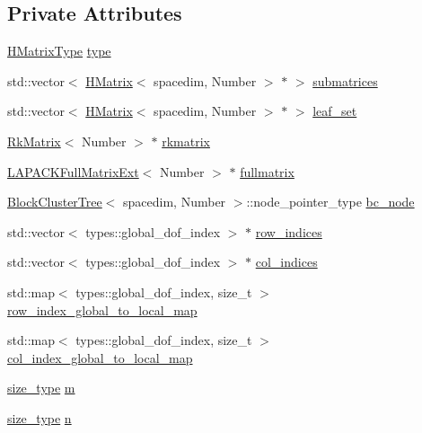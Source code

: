 \subsection*{Private Attributes}
\begin{DoxyCompactItemize}
\item 
\hyperlink{hmatrix_8h_ac04719e202c88f36e4533fe1d326a494}{H\+Matrix\+Type} \hyperlink{classHMatrix_a89ef60f3ba737c04708195ca0bb13620}{type}
\item 
std\+::vector$<$ \hyperlink{classHMatrix}{H\+Matrix}$<$ spacedim, Number $>$ $\ast$ $>$ \hyperlink{classHMatrix_a4bd1b9a32f2c7693e603a7c6ea916e4f}{submatrices}
\item 
std\+::vector$<$ \hyperlink{classHMatrix}{H\+Matrix}$<$ spacedim, Number $>$ $\ast$ $>$ \hyperlink{classHMatrix_a61dbd471077be0ad8325d0f2afe3d43f}{leaf\+\_\+set}
\item 
\hyperlink{classRkMatrix}{Rk\+Matrix}$<$ Number $>$ $\ast$ \hyperlink{classHMatrix_aa97a8f5e42aba0f1d5faf41f35a27819}{rkmatrix}
\item 
\hyperlink{classLAPACKFullMatrixExt}{L\+A\+P\+A\+C\+K\+Full\+Matrix\+Ext}$<$ Number $>$ $\ast$ \hyperlink{classHMatrix_a328134c9e9cb2c4b05d5431c0ca8a533}{fullmatrix}
\item 
\hyperlink{classBlockClusterTree}{Block\+Cluster\+Tree}$<$ spacedim, Number $>$\+::node\+\_\+pointer\+\_\+type \hyperlink{classHMatrix_a4a304494c970b5b267be1d8459d51586}{bc\+\_\+node}
\item 
std\+::vector$<$ types\+::global\+\_\+dof\+\_\+index $>$ $\ast$ \hyperlink{classHMatrix_a33b3a936f1b40e320e96d47471da07ae}{row\+\_\+indices}
\item 
std\+::vector$<$ types\+::global\+\_\+dof\+\_\+index $>$ $\ast$ \hyperlink{classHMatrix_ac30ae65e37ec5e4ccc7de2f6b9ea91e6}{col\+\_\+indices}
\item 
std\+::map$<$ types\+::global\+\_\+dof\+\_\+index, size\+\_\+t $>$ \hyperlink{classHMatrix_a4d64145335fc0521603b206a22a67578}{row\+\_\+index\+\_\+global\+\_\+to\+\_\+local\+\_\+map}
\item 
std\+::map$<$ types\+::global\+\_\+dof\+\_\+index, size\+\_\+t $>$ \hyperlink{classHMatrix_ab337c7b4f2f40699b9b7f3ab17a1e056}{col\+\_\+index\+\_\+global\+\_\+to\+\_\+local\+\_\+map}
\item 
\hyperlink{classHMatrix_a5ca8dc549783d38371a01ecd621ecb34}{size\+\_\+type} \hyperlink{classHMatrix_aa5523463043e4d542eae17d262bd22ad}{m}
\item 
\hyperlink{classHMatrix_a5ca8dc549783d38371a01ecd621ecb34}{size\+\_\+type} \hyperlink{classHMatrix_ab5ae2eb472f81f80653ed4411629c2d1}{n}

\end{DoxyCompactItemize}
